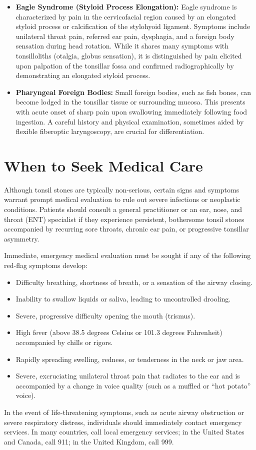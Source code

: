 \begin{itemize}
    \item \textbf{Eagle Syndrome (Styloid Process Elongation):} Eagle syndrome is characterized by pain in the cervicofacial region caused by an elongated styloid process or calcification of the stylohyoid ligament. Symptoms include unilateral throat pain, referred ear pain, dysphagia, and a foreign body sensation during head rotation. While it shares many symptoms with tonsilloliths (otalgia, globus sensation), it is distinguished by pain elicited upon palpation of the tonsillar fossa and confirmed radiographically by demonstrating an elongated styloid process.
    \item \textbf{Pharyngeal Foreign Bodies:} Small foreign bodies, such as fish bones, can become lodged in the tonsillar tissue or surrounding mucosa. This presents with acute onset of sharp pain upon swallowing immediately following food ingestion. A careful history and physical examination, sometimes aided by flexible fiberoptic laryngoscopy, are crucial for differentiation.
\end{itemize}

\section*{When to Seek Medical Care}
Although tonsil stones are typically non-serious, certain signs and symptoms warrant prompt medical evaluation to rule out severe infections or neoplastic conditions. Patients should consult a general practitioner or an ear, nose, and throat (ENT) specialist if they experience persistent, bothersome tonsil stones accompanied by recurring sore throats, chronic ear pain, or progressive tonsillar asymmetry.

Immediate, emergency medical evaluation must be sought if any of the following red-flag symptoms develop:
\begin{itemize}
    \item Difficulty breathing, shortness of breath, or a sensation of the airway closing.
    \item Inability to swallow liquids or saliva, leading to uncontrolled drooling.
    \item Severe, progressive difficulty opening the mouth (trismus).
    \item High fever (above 38.5 degrees Celsius or 101.3 degrees Fahrenheit) accompanied by chills or rigors.
    \item Rapidly spreading swelling, redness, or tenderness in the neck or jaw area.
    \item Severe, excruciating unilateral throat pain that radiates to the ear and is accompanied by a change in voice quality (such as a muffled or ``hot potato'' voice).
\end{itemize}
In the event of life-threatening symptoms, such as acute airway obstruction or severe respiratory distress, individuals should immediately contact emergency services. In many countries, call local emergency services; in the United States and Canada, call 911; in the United Kingdom, call 999.

